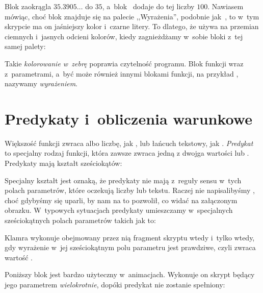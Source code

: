 \documentclass{report}
\begin{document}
Blok  zaokrągla $35.3905\ldots$ do $35$, a~blok~\code{+} dodaje do tej liczby $100$. Nawiasem mówiąc, choć blok  znajduje się na palecie ,,Wyrażenia'', podobnie jak~\code{+}, to w~tym skrypcie ma on jaśniejszy kolor i~czarne litery. To dlatego, że \Snap{} używa na przemian ciemnych i~jasnych odcieni kolorów, kiedy zagnieżdżamy w~sobie bloki z~tej samej palety:


Takie \emph{kolorowanie w~zebrę} poprawia czytelność programu. Blok funkcji wraz z~parametrami, a~być może również innymi blokami funkcji, na przykład , nazywamy \emph{wyrażeniem}.

\section{Predykaty i~obliczenia warunkowe}

Większość funkcji zwraca albo liczbę, jak , lub łańcuch tekstowy, jak . \emph{Predykat} to specjalny rodzaj funkcji, która zawsze zwraca jedną z dwojga wartości  lub . Predykaty mają kształt sześciokątów:


\begin{sloppypar}
Specjalny kształt jest oznaką, że predykaty nie mają z~reguły sensu w~tych polach parametrów, które oczekują liczby lub tekstu. Raczej nie napisalibyśmy , choć gdybyśmy się uparli, \Snap{} by nam na to pozwolił, co widać na załączonym obrazku. W~typowych sytuacjach predykaty umieszczamy w~specjalnych sześciokątnych polach parametrów takich jak to:
\end{sloppypar}


Klamra  wykonuje obejmowany przez nią fragment skryptu wtedy i~tylko wtedy, gdy wyrażenie w~jej sześciokątnym polu parametru jest prawdziwe, czyli zwraca wartość .


Poniższy blok jest bardzo użyteczny w~animacjach. Wykonuje on skrypt będący jego parametrem \emph{wielokrotnie}, dopóki predykat nie zostanie spełniony:

\end{document}
